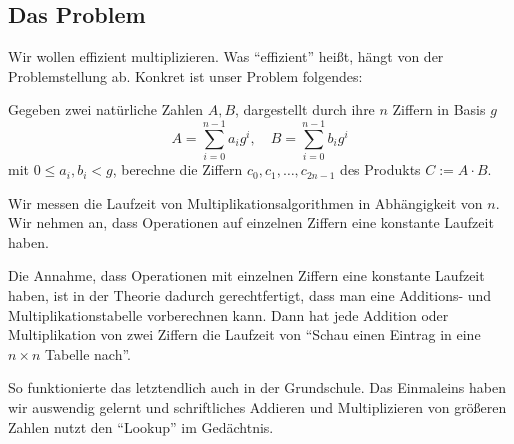 
\subsection{Das Problem}

\begin{remark}
    Wir wollen effizient multiplizieren. Was \enquote{effizient} heißt, hängt von der Problemstellung ab. Konkret ist unser Problem folgendes:

    \medskip
    Gegeben zwei natürliche Zahlen $A,B$, dargestellt durch ihre $n$ Ziffern in Basis $g$
    \[A=\sum_{i=0}^{n-1} a_i g^i,\quad B=\sum_{i=0}^{n-1} b_i g^i\]
    mit $0\leq a_i,b_i<g$, berechne die Ziffern $c_0, c_1, \ldots, c_{2n-1}$ des Produkts $C:=A\cdot B$.

    \medskip
    Wir messen die Laufzeit von Multiplikationsalgorithmen in Abhängigkeit von $n$. Wir nehmen an, dass Operationen auf einzelnen Ziffern eine konstante Laufzeit haben.
\end{remark}

\begin{remark}
    Die Annahme, dass Operationen mit einzelnen Ziffern eine konstante Laufzeit haben, ist in der Theorie dadurch gerechtfertigt, dass man eine Additions- und Multiplikationstabelle vorberechnen kann. Dann hat jede Addition oder Multiplikation von zwei Ziffern die Laufzeit von \enquote{Schau einen Eintrag in eine $n\times n$ Tabelle nach}.

    So funktionierte das letztendlich auch in der Grundschule. Das Einmaleins haben wir auswendig gelernt und schriftliches Addieren und Multiplizieren von größeren Zahlen nutzt den \enquote{Lookup} im Gedächtnis.
\end{remark}

